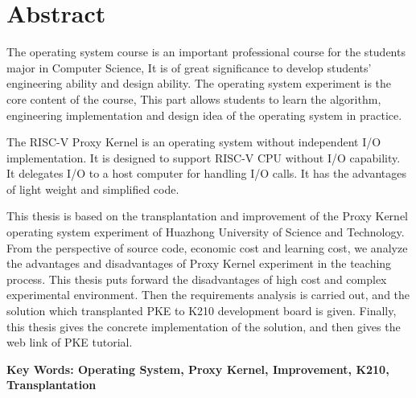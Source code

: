 \vspace*{-2mm}

\begin{spacing}{0.95}
  \centering
  \heiti{}\textbf{\thesisTitleEN}
\end{spacing}

\vspace*{17mm}

{\let\clearpage\relax \chapter*{
  \textmd{Abstract}\vskip -3bp}}
\setcounter{page}{2}

\setlength{\parskip}{0em}

The operating system course is an important professional course for the students major in Computer Science,
It is of great significance to develop students' engineering ability and design ability.
The operating system experiment is the core content of the course,
This part allows students to learn the algorithm, 
engineering implementation and design idea of the operating system in practice.

The RISC-V Proxy Kernel is an operating system without independent I/O implementation.
It is designed to support RISC-V CPU without I/O capability.
It delegates I/O to a host computer for handling I/O calls.
It has the advantages of light weight and simplified code.

This thesis is based on the transplantation and improvement of the Proxy Kernel operating system experiment of Huazhong University of Science and Technology.
From the perspective of source code, economic cost and learning cost,
we analyze the advantages and disadvantages of Proxy Kernel experiment in the teaching process.
This thesis puts forward the disadvantages of high cost and complex experimental environment.
Then the requirements analysis is carried out, and the solution which transplanted PKE to K210 development board is given.
Finally, this thesis gives the concrete implementation of the solution,
and then gives the web link of PKE tutorial.

\vspace{3ex}\noindent\textbf{Key Words: Operating System, Proxy Kernel, Improvement, K210, Transplantation}
\newpage
